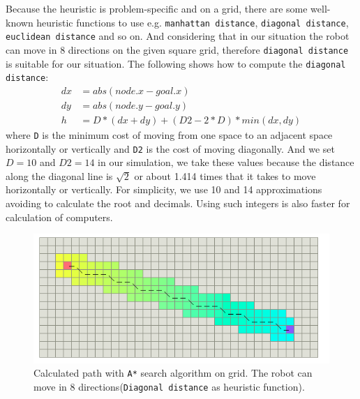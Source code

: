 Because the heuristic is problem-specific\cite{wiki_A} and on a grid, there are some well-known heuristic functions to use e.g. \texttt{manhattan distance}, \texttt{diagonal distance}, \texttt{euclidean distance} and so on. And considering that in our situation the robot can move in 8 directions on the given square grid, therefore \texttt{diagonal distance} is suitable for our situation. The following shows how to compute the \texttt{diagonal distance}:
\begin{align*}
dx &= abs(node.x - goal.x)\\
dy &= abs(node.y - goal.y) \\
h &= D * (dx + dy) + (D2 - 2 * D) * min(dx, dy)
\end{align*}
where \texttt{D} is the minimum cost of moving from one space to an adjacent space horizontally or vertically and \texttt{D2} is the cost of moving diagonally. And we set $D = 10$ and $D2 = 14$ in our simulation, we take these values because the distance along the diagonal line is $\sqrt{2}$ or about 1.414 times that it takes to move horizontally or vertically. For simplicity, we use 10 and 14 approximations avoiding to calculate the root and decimals. Using such integers is also faster for calculation of computers.

\begin{figure}[h]
\centering
\includegraphics[scale=1]{./fig/Astar.png}
\caption{Calculated path with \texttt{A*} search algorithm on grid. The robot can move in 8 directions(\texttt{Diagonal distance} as heuristic function)\cite{AHeuristic}.}
\label{fig:Astar}
\end{figure}

